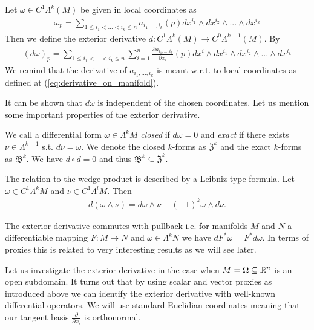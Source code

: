 \documentclass[../main.tex]{subfiles}
\begin{document}
\begin{definition}
    Let $\omega \in C^1\Lambda^k (M)$ be given in local coordinates as
    \begin{align*}
        \omega_p = \sum\limits_{1\leq i_1 < ... < i_k \leq n} 
            a_{i_1,...,i_k}(p) dx^{i_1} \wedge dx^{i_2} \wedge ... \wedge dx^{i_k}
    \end{align*}
    Then we define the exterior derivative $d: C^1 \Lambda^{k}(M) \rightarrow 
    C^0\Lambda^{k+1}(M)$. By
    \begin{align*}
        (d\omega)_p = \sum\limits_{1\leq i_1 < ... < i_k \leq n} \sum\limits_{i=1}^n
        \frac{\partial a_{i_1,...,i_k}}{\partial x_i}(p) 
        dx^i \wedge dx^{i_1} \wedge dx^{i_2} \wedge ... \wedge dx^{i_k}
    \end{align*}
    We remind that the derivative of $a_{i_1,...,i_k}$ is meant w.r.t. 
    to local coordinates as defined at (\ref{eq:derivative_on_manifold}).
\end{definition}
It can be shown that $d\omega$ is independent of the chosen coordinates. 
Let us mention some important properties of the exterior derivative. 

We call a differential form $\omega \in \Lambda^k M$ 
\textit{closed} if $d\omega = 0$ and \textit{exact}
if there exists $\nu \in \Lambda^{k-1}$ s.t. $d\nu = \omega$.
We denote the closed $k$-forms as $\mathfrak{Z}^k$ and the exact 
$k$-forms as $\mathfrak{B}^k$. We have $d\circ d = 0$ and thus 
$\mathfrak{B}^k \subseteq \mathfrak{Z}^k$.

The relation to the wedge product is described by a Leibniz-type formula. 
Let $\omega \in C^1 \Lambda^k M$ and $\nu \in C^1 \Lambda^l M$. Then
\begin{align}
    d (\omega \wedge \nu) = d\omega \wedge \nu + (-1)^k \omega \wedge d\nu.
    \label{eq:leibniz_formula}
\end{align}

The exterior derivative commutes with pullback i.e. 
for manifolds $M$ and $N$ a differentiable mapping $F:M \rightarrow N$ 
and $\omega \in \Lambda^k N$ we have $dF^* \omega = F^* d\omega$. 
In terms of proxies this is related to very interesting results as we will 
see later. 


Let us investigate the exterior derivative in the case when 
$M = \Omega \subseteq \mathbb{R}^n$ is an open subdomain. It turns out that by using 
scalar and vector proxies as introduced above we can identify the exterior 
derivative with well-known differential operators. We will use standard 
Euclidian coordinates meaning that our tangent basis $\frac{\partial}{\partial x_i}$
is orthonormal. 
\end{document}
